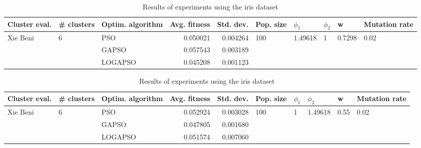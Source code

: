 \documentclass{article}
\begin{document}
\begin{table}
\centering
\caption{Results of experiments using the iris dataset}
\begin{tabular}{lllrrlllll}
\toprule
            Cluster eval. &        \# clusters & Optim. algorithm &  Avg. fitness &  Std. dev. &            Pop. size &               $\phi_{1}$ &         $\phi_{2}$ &                       w &         Mutation rate \\
\midrule
\multirow{3}{*}{Xie Beni} & \multirow{3}{*}{6} &              PSO &      0.050021 &   0.004264 & \multirow{3}{*}{100} & \multirow{3}{*}{1.49618} & \multirow{3}{*}{1} & \multirow{3}{*}{0.7298} & \multirow{3}{*}{0.02} \\
                          &                    &            GAPSO &      0.057543 &   0.003189 &                      &                          &                    &                         &                       \\
                          &                    &          LOGAPSO &      0.045208 &   0.001123 &                      &                          &                    &                         &                       \\
\bottomrule
\end{tabular}
\end{table}
\begin{table}
\centering
\caption{Results of experiments using the iris dataset}
\begin{tabular}{lllrrlllll}
\toprule
            Cluster eval. &        \# clusters & Optim. algorithm &  Avg. fitness &  Std. dev. &            Pop. size &         $\phi_{1}$ &               $\phi_{2}$ &                     w &         Mutation rate \\
\midrule
\multirow{3}{*}{Xie Beni} & \multirow{3}{*}{6} &              PSO &      0.052924 &   0.003028 & \multirow{3}{*}{100} & \multirow{3}{*}{1} & \multirow{3}{*}{1.49618} & \multirow{3}{*}{0.55} & \multirow{3}{*}{0.02} \\
                          &                    &            GAPSO &      0.047805 &   0.001680 &                      &                    &                          &                       &                       \\
                          &                    &          LOGAPSO &      0.051574 &   0.007060 &                      &                    &                          &                       &                       \\
\bottomrule
\end{tabular}
\end{table}
\end{document}
